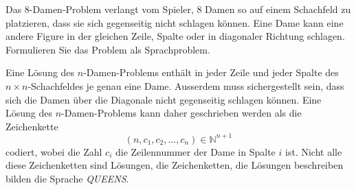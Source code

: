Das 8-Damen-Problem verlangt vom Spieler, 8 Damen so auf einem Schachfeld
zu platzieren, dass sie sich gegenseitig nicht schlagen können.
Eine Dame kann eine andere Figure in der gleichen Zeile, Spalte oder
in diagonaler Richtung schlagen.
Formulieren Sie das Problem als Sprachproblem.

\begin{loesung}
Eine Lösung des $n$-Damen-Problems enthält in jeder Zeile und
jeder Spalte des $n\times n$-Schachfeldes je genau eine Dame.
Ausserdem muss sichergestellt sein, dass sich die Damen über
die Diagonale nicht gegenseitig schlagen können.
Eine Lösung des $n$-Damen-Problems kann daher geschrieben werden
als die Zeichenkette
\[
(n,c_1,c_2,\dots,c_n) \in \mathbb{N}^{n+1}
\]
codiert, wobei die Zahl $c_i$ die Zeilennummer der Dame in Spalte $i$
ist.
Nicht alle diese Zeichenketten sind Lösungen, die Zeichenketten, die
Lösungen beschreiben bilden die Sprache \textit{QUEENS}.
\end{loesung}

